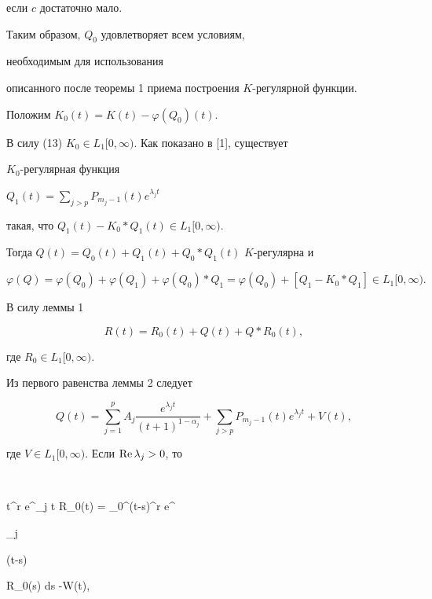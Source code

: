 если $c$ достаточно мало.





Таким образом, $Q_0$ удовлетворяет всем условиям, 


необходимым для использования


описанного после теоремы 1 приема построения $K$-регулярной функции.





Положим $K_0(t)=K(t)- \varphi (Q_0)(t).$


В силу (13)\; $K_0 \in L_1 [0,\infty)$. Как показано в [1], существует


$K_0$-регулярная функция


$Q_1(t)= \sum \limits_{j>p} P_{m_j-1}(t)e^{\lambda_j t}$


такая, что $Q_1(t)-K_0 \ast Q_1(t) \in L_1 [0,\infty).$





Тогда $Q(t)=Q_0(t)+Q_1(t)+Q_0 \ast Q_1(t)$\; $K$-регулярна и


$$


\varphi(Q)=\varphi(Q_0)+\varphi(Q_1)+\varphi(Q_0) \ast Q_1 = \varphi(Q_0) +


[Q_1-K_0 \ast Q_1] \in L_1 [0,\infty).


$$





В силу леммы 1


\begin{equation}


R(t)=R_0(t)+Q(t)+Q \ast R_0(t),


\end{equation}


где $R_0 \in L_1 [0,\infty)$.





Из первого равенства леммы 2 следует


$$


Q(t)=\sum_{j=1}^p A_j \frac {e^{\lambda_j t}}{(t+1)^{1-\alpha_j}}+


\sum_{j>p} P_{m_j-1}(t)e^{\lambda_j t} + V(t),


$$


где $V \in L_1 [0,\infty)$. Если $\operatorname{Re} \lambda_j >0$, то


$$


t^r e^{\lambda_j t} \ast R_0(t) = \int_0^\infty (t-s)^r e^{\lambda_j


(t-s)} R_0(s) ds -W(t),


